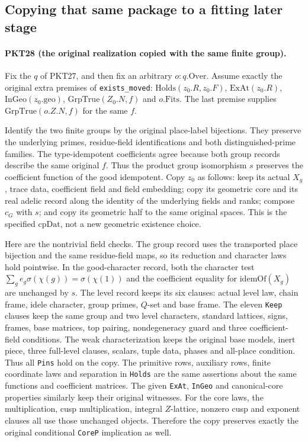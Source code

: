 \subsection{Copying that same package to a fitting later stage}

\paragraph{PKT28 (the original realization copied with the same finite group).}\label{claim:PKT28}
Fix the $q$ of PKT27, and then fix an arbitrary $o:q.\mathrm{Over}$.
Assume exactly the original extra premises of \texttt{exists\_moved}:
$\mathrm{Holds}(z_0.R,z_0.F)$, $\mathrm{ExAt}(z_0.R)$,
$\mathrm{InGeo}(z_0.\mathrm{geo})$, $\mathrm{GrpTrue}(Z_0.N,f)$ and
$o.\mathrm{Fits}$.  The last premise supplies
$\mathrm{GrpTrue}(o.Z.N,f)$ for the same $f$.

Identify the two finite groups by the original place-label bijections.
They preserve the underlying primes, residue-field identifications and
both distinguished-prime families.  The type-idempotent coefficients agree
because both group records describe the same original $f$.  Thus the
product group isomorphism $s$ preserves the coefficient function of the
good idempotent.  Copy $z_0$ as follows: keep its actual $X_g$, trace data,
coefficient field and field embedding; copy its geometric core and its
real adelic record along the identity of the underlying fields and ranks;
compose $c_G$ with $s$; and copy its geometric half to the same original
spaces.  This is the specified $\mathrm{cpDat}$, not a new geometric
existence choice.

Here are the nontrivial field checks.  The group record uses the transported
place bijection and the same residue-field maps, so its reduction and
character laws hold pointwise.  In the good-character record, both the
character test
$\sum_g e_g\sigma(\chi(g))=\sigma(\chi(1))$ and the coefficient equality
for $\mathrm{idemOf}(X_g)$ are unchanged by $s$.  The level record keeps
its six clauses: actual level law, chain frame, idele character, group
primes, $Q$-set and base frame.  The eleven \texttt{Keep} clauses keep
the same group and two level characters, standard lattices, signs, frames,
base matrices, top pairing, nondegeneracy guard and three coefficient-field
conditions.  The weak characterization keeps the original base models,
inert piece, three full-level clauses, scalars, tuple data, phases and
all-place condition.  Thus all \texttt{Pins} hold on the copy.  The
primitive rows, auxiliary rows, finite coordinate laws and separation in
\texttt{Holds} are the same assertions about the same functions and
coefficient matrices.  The given \texttt{ExAt}, \texttt{InGeo} and
canonical-core properties similarly keep their original witnesses.
For the core laws, the multiplication, cusp multiplication, integral
$Z$-lattice, nonzero cusp and exponent clauses all use those unchanged
objects.  Therefore the copy preserves exactly the original conditional
\texttt{CoreP} implication as well.

